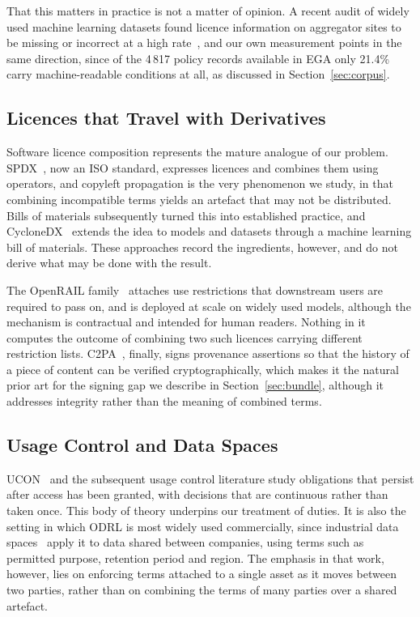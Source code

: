 \documentclass[sigconf,anonymous,review]{acmart}
\begin{document}
That this matters in practice is not a matter of opinion. A recent audit of
widely used machine learning datasets found licence information on aggregator
sites to be missing or incorrect at a high rate~\cite{provenance}, and our own
measurement points in the same direction, since of the 4\,817 policy records
available in EGA only 21.4\% carry machine-readable conditions at all, as
discussed in Section~\ref{sec:corpus}.

\subsection{Licences that Travel with Derivatives}

Software licence composition represents the mature analogue of our problem.
SPDX~\cite{spdx}, now an ISO standard, expresses licences and combines them using
operators, and copyleft propagation is the very phenomenon we study, in that
combining incompatible terms yields an artefact that may not be distributed.
Bills of materials subsequently turned this into established practice, and
CycloneDX~\cite{cyclonedx} extends the idea to models and datasets through a
machine learning bill of materials. These approaches record the ingredients,
however, and do not derive what may be done with the result.

The OpenRAIL family~\cite{openrail} attaches use restrictions that downstream
users are required to pass on, and is deployed at scale on widely used models,
although the mechanism is contractual and intended for human readers. Nothing in
it computes the outcome of combining two such licences carrying different
restriction lists. C2PA~\cite{c2pa}, finally, signs provenance assertions so that
the history of a piece of content can be verified cryptographically, which makes
it the natural prior art for the signing gap we describe in
Section~\ref{sec:bundle}, although it addresses integrity rather than the meaning
of combined terms.

\subsection{Usage Control and Data Spaces}

UCON~\cite{ucon} and the subsequent usage control literature study obligations
that persist after access has been granted, with decisions that are continuous
rather than taken once. This body of theory underpins our treatment of duties. It
is also the setting in which ODRL is most widely used commercially, since
industrial data spaces~\cite{ids} apply it to data shared between companies,
using terms such as permitted purpose, retention period and region. The emphasis
in that work, however, lies on enforcing terms attached to a single asset as it
moves between two parties, rather than on combining the terms of many parties
over a shared artefact.
\end{document}
